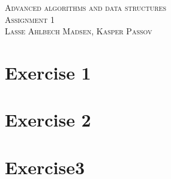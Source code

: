 \documentclass{article}
\begin{document}
\begin{center}
\textsc{\Large Advanced algorithms and data structures}\\[0.5cm]
\textsc{\large Assignment 1}\\[0.5cm]
\textsc{\large Lasse Ahlbech Madsen, Kasper Passov}\\[0.5cm]
\vspace{1 cm}
\end{center}

\section*{Exercise 1}

\section*{Exercise 2}





\section*{Exercise3}



\end{document}
